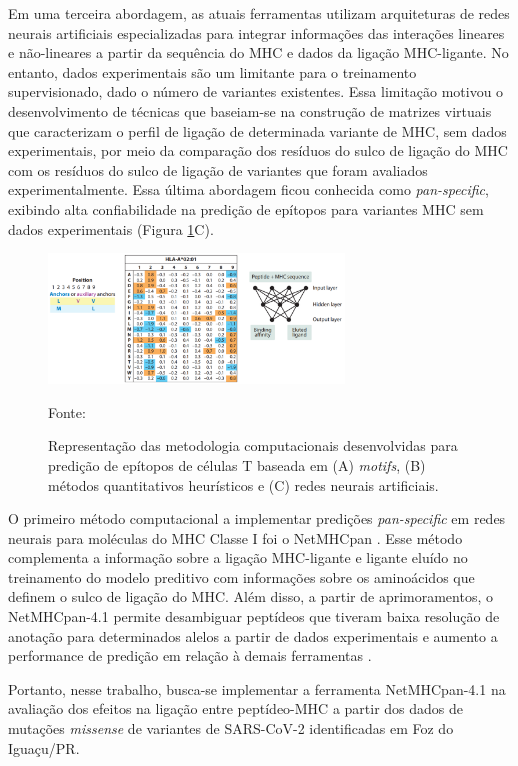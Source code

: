 \begin{justify}
Em uma terceira abordagem, as atuais ferramentas utilizam arquiteturas de redes neurais artificiais especializadas para integrar informações das interações lineares e não-lineares a partir da sequência do MHC e dados da ligação MHC-ligante. No entanto, dados experimentais são um limitante para o treinamento supervisionado, dado o número de variantes existentes. Essa limitação motivou o desenvolvimento de técnicas que baseiam-se na construção de matrizes virtuais que caracterizam o perfil de ligação de determinada variante de MHC, sem dados experimentais, por meio da comparação  dos resíduos do sulco de ligação do MHC com os resíduos do sulco de ligação de variantes que foram avaliados experimentalmente. Essa última abordagem ficou conhecida como \textit{pan-specific}, exibindo alta confiabilidade na predição de epítopos  para variantes MHC sem dados experimentais (Figura \ref{fig:fig4}C).

\begin{figure}
    \centering
    \caption{\justifying Representação das metodologia computacionais desenvolvidas para predição de epítopos de células T baseada em (A) \textit{motifs}, (B) métodos quantitativos heurísticos e (C) redes neurais artificiais.  }
    \includegraphics[width=0.7\textwidth]{Figuras/fig4.png}
    \label{fig:fig4}
    \begin{minipage}{0.7\textwidth} %
        \centering
        \footnotesize Fonte: 
    \end{minipage}
\end{figure}

\begin{figure}
\end{figure}

\vspace{10mm}

O primeiro método computacional a implementar predições \textit{pan-specific}  em redes neurais para moléculas do MHC Classe I foi o NetMHCpan \cite{Hoof:2009}. Esse método complementa a informação sobre a ligação MHC-ligante e ligante eluído no treinamento do modelo preditivo com informações sobre os aminoácidos que definem o sulco de ligação do MHC. Além disso, a partir de aprimoramentos, o NetMHCpan-4.1 permite desambiguar peptídeos que tiveram baixa resolução de anotação para determinados alelos a partir de dados experimentais e aumento a performance de predição em relação à demais ferramentas \cite{Reynisson:2020}.

Portanto, nesse trabalho, busca-se implementar a ferramenta NetMHCpan-4.1 na avaliação dos efeitos na ligação entre peptídeo-MHC a partir dos dados de mutações \textit{missense} de variantes de SARS-CoV-2 identificadas em Foz do Iguaçu/PR. 

\end{justify}


